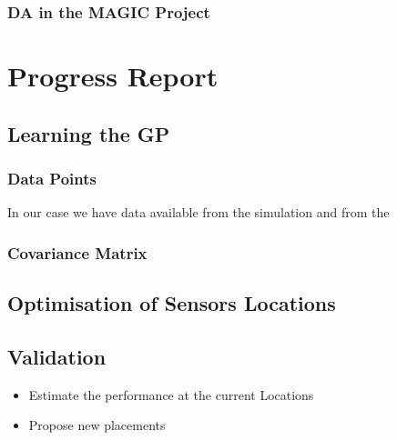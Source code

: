\documentclass[11pt,a4paper]{article}
\numberwithin{equation}{section}
\begin{document}
\subsubsection{DA in the MAGIC Project}


\pagebreak
\section{Progress Report}

\subsection{Learning the GP}
\subsubsection{Data Points}
In our case we have data available from the simulation and from the 

\subsubsection{Covariance Matrix}


\subsection{Optimisation of Sensors Locations}

\subsection{Validation}

\begin{itemize}
	\item Estimate the performance at the current Locations
	\item Propose new placements 
\end{itemize}

\pagebreak


\end{document}
